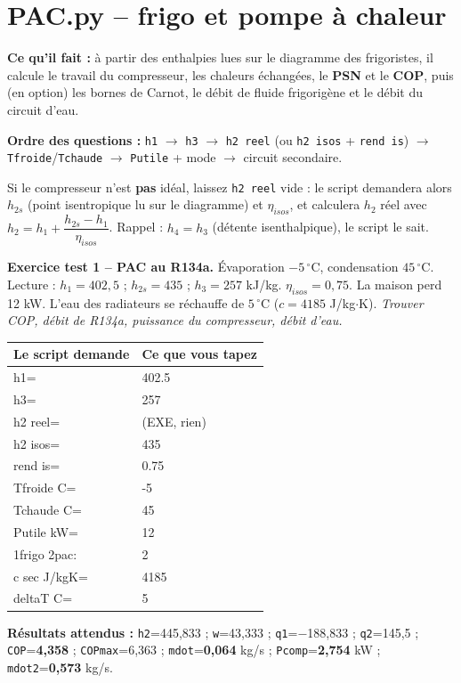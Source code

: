 \documentclass[10.5pt,a4paper]{article}
\makeatletter
\newenvironment{saisie}{%
\begin{center}\small
\begin{tabular}{@{}>{\ttfamily}l l@{}}
\toprule
\textrm{\textbf{Le script demande}} & \textbf{Ce que vous tapez} \\
\midrule
}{%
\bottomrule
\end{tabular}
\end{center}
}
\makeatother
\begin{document}
\newpage
\section{PAC.py -- frigo et pompe à chaleur}

\begin{objectif}
\textbf{Ce qu'il fait :} à partir des enthalpies lues sur le diagramme des frigoristes, il calcule le
travail du compresseur, les chaleurs échangées, le \textbf{PSN} et le \textbf{COP}, puis (en option) les
bornes de Carnot, le débit de fluide frigorigène et le débit du circuit d'eau.
\end{objectif}

\textbf{Ordre des questions :} \texttt{h1} $\rightarrow$ \texttt{h3} $\rightarrow$ \texttt{h2 reel}
(ou \texttt{h2 isos} + \texttt{rend is}) $\rightarrow$ \texttt{Tfroide}/\texttt{Tchaude} $\rightarrow$
\texttt{Putile} + mode $\rightarrow$ circuit secondaire.

\begin{piege}
Si le compresseur n'est \textbf{pas} idéal, laissez \texttt{h2 reel} vide : le script demandera alors
$h_{2s}$ (point isentropique lu sur le diagramme) et $\eta_{isos}$, et calculera $h_2$ réel avec
$h_2=h_1+\dfrac{h_{2s}-h_1}{\eta_{isos}}$. Rappel : $h_4=h_3$ (détente isenthalpique), le script le sait.
\end{piege}

\begin{test}
\textbf{Exercice test 1 -- PAC au R134a.} Évaporation $-5\,^\circ$C, condensation $45\,^\circ$C.
Lecture : $h_1=402{,}5$ ; $h_{2s}=435$ ; $h_3=257$ kJ/kg. $\eta_{isos}=0{,}75$. La maison perd 12 kW.
L'eau des radiateurs se réchauffe de $5\,^\circ$C ($c=4185$ J/kg$\cdot$K).
\emph{Trouver COP, débit de R134a, puissance du compresseur, débit d'eau.}

\begin{saisie}
h1= & 402.5 \\
h3= & 257 \\
h2 reel= & \textrm{(EXE, rien)} \\
h2 isos= & 435 \\
rend is= & 0.75 \\
Tfroide C= & -5 \\
Tchaude C= & 45 \\
Putile kW= & 12 \\
1frigo 2pac: & 2 \\
c sec J/kgK= & 4185 \\
deltaT C= & 5 \\
\end{saisie}

\textbf{Résultats attendus :} \texttt{h2}=445,833 ; \texttt{w}=43,333 ; \texttt{q1}=$-$188,833 ;
\texttt{q2}=145,5 ; \texttt{COP}=\textbf{4,358} ; \texttt{COPmax}=6,363 ;
\texttt{mdot}=\textbf{0,064} kg/s ; \texttt{Pcomp}=\textbf{2,754} kW ; \texttt{mdot2}=\textbf{0,573} kg/s.
\end{test}
\end{document}
